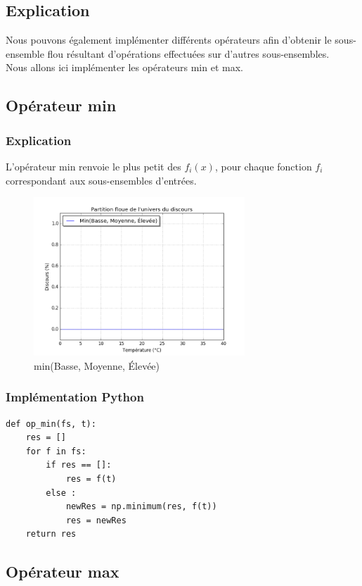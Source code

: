 \documentclass[a4paper]{article}
\begin{document}
\subsection{Explication}
Nous pouvons également implémenter différents opérateurs afin d'obtenir le sous-ensemble flou résultant d'opérations effectuées sur d'autres sous-ensembles.\\
Nous allons ici implémenter les opérateurs min et max.

\subsection{Opérateur min}

\subsubsection{Explication}
L'opérateur min renvoie le plus petit des $f_i(x)$, pour chaque fonction $f_i$ correspondant aux sous-ensembles d'entrées.

\begin{figure}[h]
\begin{center}
	\includegraphics[width=300px]{plot_test_min.png}
\end{center}
\caption{min(Basse, Moyenne, Élevée)}
\end{figure}

\subsubsection{Implémentation Python}
\begin{lstlisting}
def op_min(fs, t):
    res = []
    for f in fs:
        if res == []:
            res = f(t)
        else :
            newRes = np.minimum(res, f(t))
            res = newRes
    return res
\end{lstlisting}

\clearpage
\subsection{Opérateur max}
\end{document}
